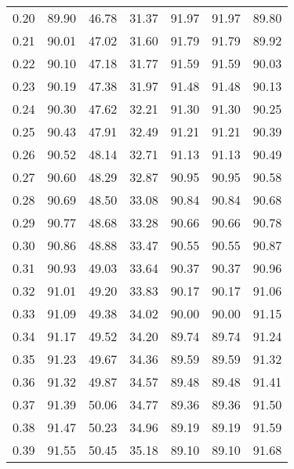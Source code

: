 \begin{tabular}{|c|c|c|c|c|c|c|}
      0.20 &     89.90 &     46.78 &      31.37 &   91.97 &      91.97 &         89.80 \\
      0.21 &     90.01 &     47.02 &      31.60 &   91.79 &      91.79 &         89.92 \\
      0.22 &     90.10 &     47.18 &      31.77 &   91.59 &      91.59 &         90.03 \\
      0.23 &     90.19 &     47.38 &      31.97 &   91.48 &      91.48 &         90.13 \\
      0.24 &     90.30 &     47.62 &      32.21 &   91.30 &      91.30 &         90.25 \\
      0.25 &     90.43 &     47.91 &      32.49 &   91.21 &      91.21 &         90.39 \\
      0.26 &     90.52 &     48.14 &      32.71 &   91.13 &      91.13 &         90.49 \\
      0.27 &     90.60 &     48.29 &      32.87 &   90.95 &      90.95 &         90.58 \\
      0.28 &     90.69 &     48.50 &      33.08 &   90.84 &      90.84 &         90.68 \\
      0.29 &     90.77 &     48.68 &      33.28 &   90.66 &      90.66 &         90.78 \\
      0.30 &     90.86 &     48.88 &      33.47 &   90.55 &      90.55 &         90.87 \\
      0.31 &     90.93 &     49.03 &      33.64 &   90.37 &      90.37 &         90.96 \\
      0.32 &     91.01 &     49.20 &      33.83 &   90.17 &      90.17 &         91.06 \\
      0.33 &     91.09 &     49.38 &      34.02 &   90.00 &      90.00 &         91.15 \\
      0.34 &     91.17 &     49.52 &      34.20 &   89.74 &      89.74 &         91.24 \\
      0.35 &     91.23 &     49.67 &      34.36 &   89.59 &      89.59 &         91.32 \\
      0.36 &     91.32 &     49.87 &      34.57 &   89.48 &      89.48 &         91.41 \\
      0.37 &     91.39 &     50.06 &      34.77 &   89.36 &      89.36 &         91.50 \\
      0.38 &     91.47 &     50.23 &      34.96 &   89.19 &      89.19 &         91.59 \\
      0.39 &     91.55 &     50.45 &      35.18 &   89.10 &      89.10 &         91.68 \\

\end{tabular}
